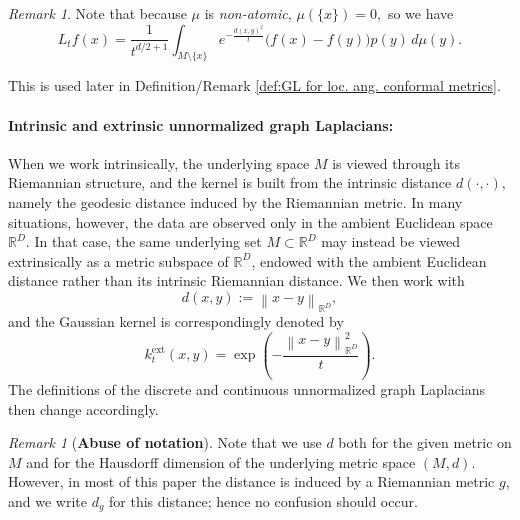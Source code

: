\documentclass{amsart}
\theoremstyle{definition}
\theoremstyle{remark}
\newtheorem{remark}[theorem]{Remark}
\newcommand{\nd}{\noindent}
\newcommand{\norm}[1]{\left\lVert#1\right\rVert}
\newcommand{\Ddim}{\mathbb{R}^D}
\newcommand{\0}{\boldsymbol{0}}
\begin{document}
\begin{remark}\label{rmk:almost everywhere defined}
    Note that because $\mu$ is\textit{ non-atomic},  $\mu(\{x\})=0,$ so we have
    \[
    L_t f(x)
= \frac{1}{t^{d/2+1}} \int_{M\setminus \{x\}}
  e^{-\frac{d(x,y)^2}{t}}\big(f(x)-f(y)\big) p(y)\,d\mu(y).
    \]

\nd This is used later in Definition/Remark \ref{def:GL for loc. ang. conformal metrics}.
\end{remark}


\paragraph{\textbf{Intrinsic and extrinsic unnormalized graph Laplacians:}}
When we work intrinsically, the underlying space $M$ is viewed through its Riemannian structure, and the kernel is built from the intrinsic distance $d(\cdot,\cdot)$, namely the geodesic distance induced by the Riemannian metric. In many situations, however, the data are observed only in the ambient Euclidean space $\Ddim$. In that case, the same underlying set $M\subset \Ddim$ may instead be viewed extrinsically as a metric subspace of $\Ddim$, endowed with the ambient Euclidean distance rather than its intrinsic Riemannian distance. We then work with
\[
d(x,y):=\norm{x-y}_{\Ddim},
\]
and the Gaussian kernel is correspondingly denoted by
\[
k_t^{\operatorname{ext}}(x,y) = \exp\!\left(-\frac{\norm{x-y}_{\Ddim}^2}{t}\right).
\]
\noindent
The definitions of the discrete and continuous unnormalized graph Laplacians then change accordingly.

\begin{remark}[\textbf{Abuse of notation}]
    Note that we use $d$ both for the given metric on $M$ and for the Hausdorff dimension of the underlying metric space $(M,d)$. However, in most of this paper the distance is induced by a Riemannian metric $g$, and we write $d_g$ for this distance; hence no confusion should occur.
\end{remark}
\end{document}
